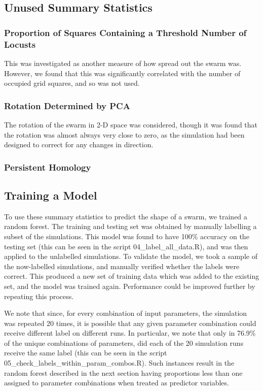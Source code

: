 \documentclass[a4paper]{article}
\begin{document}
\subsection*{Unused Summary Statistics}

\subsubsection{Proportion of Squares Containing a Threshold Number of Locusts}

This was investigated as another measure of how spread out the swarm was. However, we found that this was significantly correlated with the number of occupied grid squares, and so was not used.

\subsubsection{Rotation Determined by PCA}

The rotation of the swarm in 2-D space was considered, though it was found that the rotation was almost always very close to zero, as the simulation had been designed to correct for any changes in direction.

\subsubsection{Persistent Homology}

{\color{red}{Include some persistence diagrams to show qualitatively how well this performs.}}

\subsection{Training a Model}

To use these summary statistics to predict the shape of a swarm, we trained a random forest. The training and testing set was obtained by manually labelling a subset of the simulations. This model was found to have 100\% accuracy on the testing set (this can be seen in the script 04\_label\_all\_data.R), and was then applied to the unlabelled simulations. To validate the model, we took a sample of the now-labelled simulations, and manually verified whether the labels were correct. This produced a new set of training data which was added to the existing set, and the model was trained again. Performance could be improved further by repeating this process.

We note that since, for every combination of input parameters, the simulation was repeated 20 times, it is possible that any given parameter combination could receive different label on different runs. In particular, we note that only in 76.9\% of the unique combinations of parameters, did each of the 20 simulation runs receive the same label (this can be seen in the script 05\_check\_labels\_within\_param\_combos.R). Such instances result in the random forest described in the next section having proportions less than one assigned to parameter combinations when treated as predictor variables.
\end{document}
